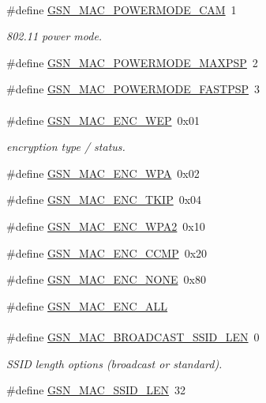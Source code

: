 \paragraph*{}
\begin{DoxyCompactItemize}
\item 
\#define \hyperlink{a00642_ga8562dc7df79490dc400c2a694356c55d}{GSN\_\-MAC\_\-POWERMODE\_\-CAM}~1
\begin{DoxyCompactList}\small\item\em 802.11 power mode. \end{DoxyCompactList}\item 
\#define \hyperlink{a00642_ga751f71fb490748186b9e7ffc85d77b74}{GSN\_\-MAC\_\-POWERMODE\_\-MAXPSP}~2
\item 
\#define \hyperlink{a00642_ga4533fe3149beb1276a66d8d703fb8c4a}{GSN\_\-MAC\_\-POWERMODE\_\-FASTPSP}~3
\end{DoxyCompactItemize}

\paragraph*{}
\begin{DoxyCompactItemize}
\item 
\#define \hyperlink{a00642_ga97e73490c2ebf96dc976cfa9819ca342}{GSN\_\-MAC\_\-ENC\_\-WEP}~0x01
\begin{DoxyCompactList}\small\item\em encryption type / status. \end{DoxyCompactList}\item 
\#define \hyperlink{a00642_ga41cad5522df15c08084272449a15f488}{GSN\_\-MAC\_\-ENC\_\-WPA}~0x02
\item 
\#define \hyperlink{a00642_gae50c827781cd44789ebc5ace15ce7fac}{GSN\_\-MAC\_\-ENC\_\-TKIP}~0x04
\item 
\#define \hyperlink{a00642_gad400c18aedc0468b5338a51ddfd65803}{GSN\_\-MAC\_\-ENC\_\-WPA2}~0x10
\item 
\#define \hyperlink{a00642_gaaec086a1c50b8286b787d02bedd41fbf}{GSN\_\-MAC\_\-ENC\_\-CCMP}~0x20
\item 
\#define \hyperlink{a00642_gaa8b7bb2627d27e63f25be3787fa8abc1}{GSN\_\-MAC\_\-ENC\_\-NONE}~0x80
\item 
\#define \hyperlink{a00642_gae6f462d0bcd3c5811fb25ec43699b8c8}{GSN\_\-MAC\_\-ENC\_\-ALL}
\end{DoxyCompactItemize}

\paragraph*{}
\begin{DoxyCompactItemize}
\item 
\#define \hyperlink{a00642_gaa9374ba371dac462bbc520ad04eb91a1}{GSN\_\-MAC\_\-BROADCAST\_\-SSID\_\-LEN}~0
\begin{DoxyCompactList}\small\item\em SSID length options (broadcast or standard). \end{DoxyCompactList}\item 
\#define \hyperlink{a00642_gabc6a02f5958aac465500370ca12dd011}{GSN\_\-MAC\_\-SSID\_\-LEN}~32
\end{DoxyCompactItemize}

